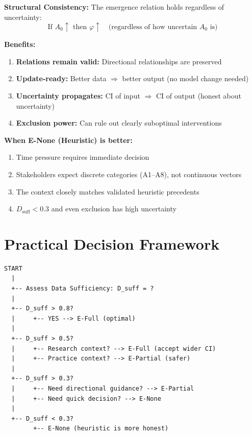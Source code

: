 \begin{tcolorbox}[colback=green!5!white, colframe=green!75!black,
    title=\textbf{Why Use E-Full Even with $C < 0.7$?}]

\textbf{Structural Consistency:} The emergence relation holds regardless of uncertainty:
\begin{equation}
\text{If } A_0 \uparrow \text{ then } \varphi \uparrow \quad \text{(regardless of how uncertain } A_0 \text{ is)}
\end{equation}

\textbf{Benefits:}
\begin{enumerate}[nosep]
    \item \textbf{Relations remain valid:} Directional relationships are preserved
    \item \textbf{Update-ready:} Better data $\Rightarrow$ better output (no model change needed)
    \item \textbf{Uncertainty propagates:} CI of input $\Rightarrow$ CI of output (honest about uncertainty)
    \item \textbf{Exclusion power:} Can rule out clearly suboptimal interventions
\end{enumerate}

\textbf{When E-None (Heuristic) is better:}
\begin{enumerate}[nosep]
    \item Time pressure requires immediate decision
    \item Stakeholders expect discrete categories (A1--A8), not continuous vectors
    \item The context closely matches validated heuristic precedents
    \item $D_{\text{suff}} < 0.3$ and even exclusion has high uncertainty
\end{enumerate}
\end{tcolorbox}


\section{Practical Decision Framework}
\label{sec:ie-decision-framework}

\begin{tcolorbox}[colback=yellow!5!white, colframe=yellow!75!black,
    title=\textbf{Decision Tree: Which Emergence Mode?}]

\begin{verbatim}
START
  |
  +-- Assess Data Sufficiency: D_suff = ?
  |
  +-- D_suff > 0.8?
  |     +-- YES --> E-Full (optimal)
  |
  +-- D_suff > 0.5?
  |     +-- Research context? --> E-Full (accept wider CI)
  |     +-- Practice context? --> E-Partial (safer)
  |
  +-- D_suff > 0.3?
  |     +-- Need directional guidance? --> E-Partial
  |     +-- Need quick decision? --> E-None
  |
  +-- D_suff < 0.3?
        +-- E-None (heuristic is more honest)
\end{verbatim}
\end{tcolorbox}

